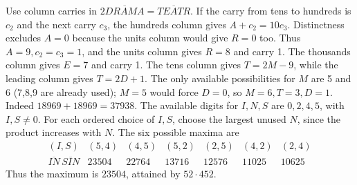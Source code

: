 Use column carries in $2\overline{DRAMA}=\overline{TEATR}$. If the carry from tens to hundreds is $c_2$ and the next carry $c_3$, the hundreds column gives $A+c_2=10c_3$. Distinctness excludes $A=0$ because the units column would give $R=0$ too. Thus $A=9,c_2=c_3=1$, and the units column gives $R=8$ and carry 1. The thousands column gives $E=7$ and carry 1. The tens column gives $T=2M-9$, while the leading column gives $T=2D+1$. The only available possibilities for $M$ are 5 and 6 (7,8,9 are already used); $M=5$ would force $D=0$, so $M=6,T=3,D=1$. Indeed $18969+18969=37938$.
The available digits for $I,N,S$ are $0,2,4,5$, with $I,S\ne0$. For each ordered choice of $I,S$, choose the largest unused $N$, since the product increases with $N$. The six possible maxima are
\[\begin{array}{c|rrrrrr}(I,S)&(5,4)&(4,5)&(5,2)&(2,5)&(4,2)&(2,4)\\\hline \overline{IN}\,\overline{SIN}&23504&22764&13716&12576&11025&10625\end{array}\]
Thus the maximum is $\boxed{23504}$, attained by $52\cdot452$.

